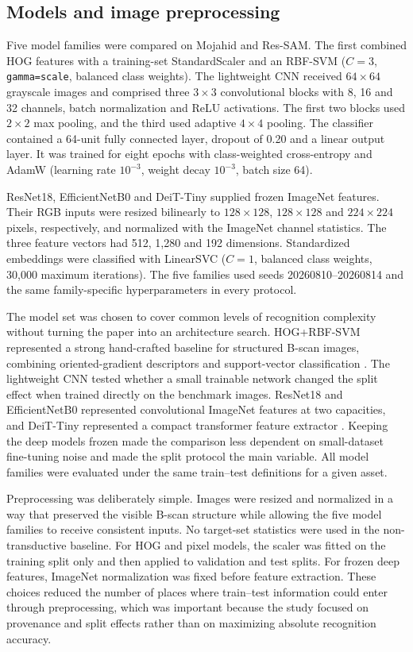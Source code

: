 \documentclass[]{interact}
\begin{document}
\subsection{Models and image preprocessing}

Five model families were compared on Mojahid and Res-SAM. The first combined HOG features with a training-set StandardScaler and an RBF-SVM ($C=3$, \texttt{gamma=scale}, balanced class weights). The lightweight CNN received $64\times64$ grayscale images and comprised three $3\times3$ convolutional blocks with 8, 16 and 32 channels, batch normalization and ReLU activations. The first two blocks used $2\times2$ max pooling, and the third used adaptive $4\times4$ pooling. The classifier contained a 64-unit fully connected layer, dropout of 0.20 and a linear output layer. It was trained for eight epochs with class-weighted cross-entropy and AdamW (learning rate $10^{-3}$, weight decay $10^{-3}$, batch size 64).

ResNet18, EfficientNetB0 and DeiT-Tiny supplied frozen ImageNet features. Their RGB inputs were resized bilinearly to $128\times128$, $128\times128$ and $224\times224$ pixels, respectively, and normalized with the ImageNet channel statistics. The three feature vectors had 512, 1,280 and 192 dimensions. Standardized embeddings were classified with LinearSVC ($C=1$, balanced class weights, 30,000 maximum iterations). The five families used seeds 20260810--20260814 and the same family-specific hyperparameters in every protocol.

The model set was chosen to cover common levels of recognition complexity without turning the paper into an architecture search. HOG+RBF-SVM represented a strong hand-crafted baseline for structured B-scan images, combining oriented-gradient descriptors and support-vector classification \cite{dalal2005hog,cortes1995svm}. The lightweight CNN tested whether a small trainable network changed the split effect when trained directly on the benchmark images. ResNet18 and EfficientNetB0 represented convolutional ImageNet features at two capacities, and DeiT-Tiny represented a compact transformer feature extractor \cite{deng2009imagenet,he2016resnet,tan2019efficientnet,touvron2021deit}. Keeping the deep models frozen made the comparison less dependent on small-dataset fine-tuning noise and made the split protocol the main variable. All model families were evaluated under the same train--test definitions for a given asset.

Preprocessing was deliberately simple. Images were resized and normalized in a way that preserved the visible B-scan structure while allowing the five model families to receive consistent inputs. No target-set statistics were used in the non-transductive baseline. For HOG and pixel models, the scaler was fitted on the training split only and then applied to validation and test splits. For frozen deep features, ImageNet normalization was fixed before feature extraction. These choices reduced the number of places where train--test information could enter through preprocessing, which was important because the study focused on provenance and split effects rather than on maximizing absolute recognition accuracy.
\end{document}
